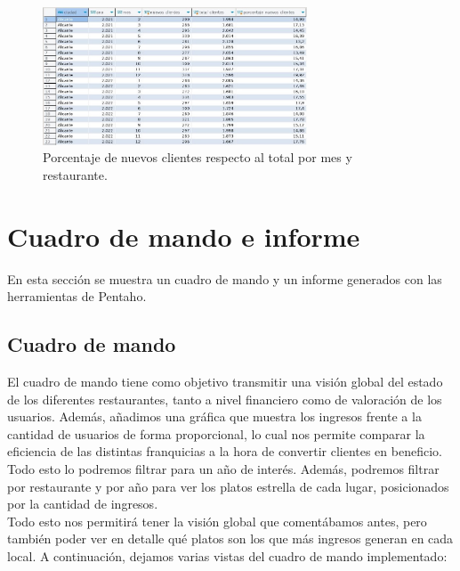 \documentclass[11pt]{opticajnl}
\begin{document}
\begin{figure}[H]
    \centering
    \includegraphics[width=0.7\textwidth]{fotos/q6.jpg}
    \caption{Porcentaje de nuevos clientes respecto al total por mes y restaurante.}
    \label{fig:rolap5}
\end{figure}




\section{Cuadro de mando e informe}

\noindent En esta sección se muestra un cuadro de mando y un informe generados con las herramientas de Pentaho.

\subsection{Cuadro de mando}

El cuadro de mando tiene como objetivo transmitir una visión global del estado de los diferentes restaurantes, tanto a nivel financiero como de valoración de los usuarios. Además, añadimos una gráfica que muestra los ingresos frente a la cantidad de usuarios de forma proporcional, lo cual nos permite comparar la eficiencia de las distintas franquicias a la hora de convertir clientes en beneficio. Todo esto lo podremos filtrar para un año de interés. Además, podremos filtrar por restaurante y por año para ver los platos estrella de cada lugar, posicionados por la cantidad de ingresos. \\

Todo esto nos permitirá tener la visión global que comentábamos antes, pero también poder ver en detalle qué platos son los que más ingresos generan en cada local. A continuación, dejamos varias vistas del cuadro de mando implementado:
\end{document}
